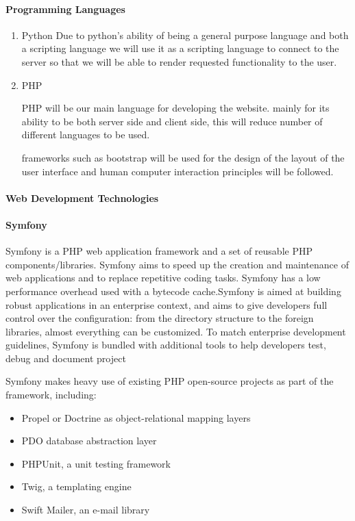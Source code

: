 \documentclass{article}
\begin{document}
			\paragraph{Programming Languages}
				\begin{enumerate}
 					 \item Python
 					 		Due to python's ability of being a general purpose language and both a scripting language
 					 		we will use it as a scripting language to connect to the server so that we will be able to
 					 		render requested functionality to the user.
  						\item PHP
  							\par PHP will be our main language for developing the website. mainly for its ability to be both 	
  							server side and client side, this will reduce number of different languages to be used.
  							
  							\par frameworks such as bootstrap will be used for the design of the 
  							layout of the user interface and human
  							computer interaction principles will be followed.
				\end{enumerate}
				
			\paragraph{Web Development Technologies}
				\paragraph{Symfony \newline}	
					 Symfony is a PHP web application framework and a set of reusable PHP components/libraries.
					Symfony aims to speed up the creation and maintenance of web applications and to 
					replace repetitive coding tasks.
					Symfony has a low performance overhead used with a bytecode cache.Symfony is aimed at building robust applications in an enterprise context, and aims to
					 give developers full control over the configuration: from the directory structure to the
					  foreign libraries, almost everything can be customized. To match enterprise
					   development guidelines, Symfony is bundled with additional tools to help developers test, debug 
					  and document project
					  
					  Symfony makes heavy use of existing PHP open-source projects as part of the framework, including:
					  \begin{itemize}
					  	\item Propel or Doctrine as object-relational mapping layers
					  	\item PDO database abstraction layer 
					  	\item PHPUnit, a unit testing framework
					  	\item Twig, a templating engine
					  	\item Swift Mailer, an e-mail library
					  \end{itemize}
					  
\end{document}
